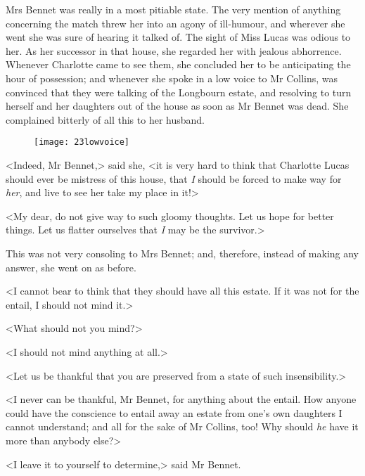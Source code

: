 Mrs Bennet was really in a most pitiable state. The very mention of anything concerning the match threw her into an agony of ill-humour, and wherever she went she was sure of hearing it talked of. The sight of Miss Lucas was odious to her. As her successor in that house, she regarded her with jealous abhorrence. Whenever Charlotte came to see them, she concluded her to be anticipating the hour of possession; and whenever she spoke in a low voice to Mr Collins, was convinced that they were talking of the Longbourn estate, and resolving to turn herself and her daughters out of the house as soon as Mr Bennet was dead. She complained bitterly of all this to her husband.

\begin{figure}[tbph]
\centering
\texttt{[image: 23lowvoice]}
\end{figure}

<Indeed, Mr Bennet,> said she, <it is very hard to think that Charlotte Lucas should ever be mistress of this house, that \textit{I} should be forced to make way for \textit{her}, and live to see her take my place in it!>

<My dear, do not give way to such gloomy thoughts. Let us hope for better things. Let us flatter ourselves that \textit{I} may be the survivor.>

This was not very consoling to Mrs Bennet; and, therefore, instead of making any answer, she went on as before.

<I cannot bear to think that they should have all this estate. If it was not for the entail, I should not mind it.>

<What should not you mind?>

<I should not mind anything at all.>

<Let us be thankful that you are preserved from a state of such insensibility.>

<I never can be thankful, Mr Bennet, for anything about the entail. How anyone could have the conscience to entail away an estate from one's own daughters I cannot understand; and all for the sake of Mr Collins, too! Why should \textit{he} have it more than anybody else?>

<I leave it to yourself to determine,> said Mr Bennet.
